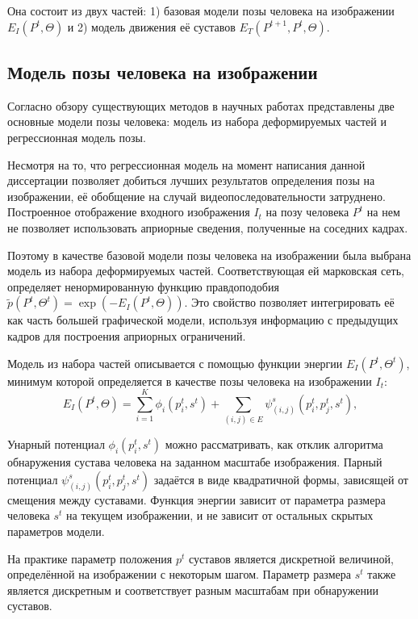 Она состоит из двух частей: 1) базовая модели позы человека на изображении $E_I(P^t, \Theta)$ и 2) модель движения её суставов $E_T(P^{t+1}, P^{t}, \Theta)$.

\subsection{Модель позы человека на изображении}

Согласно обзору существующих методов в научных работах представлены две основные модели позы человека: модель из набора деформируемых частей и регрессионная модель позы.

Несмотря на то, что регрессионная модель на момент написания данной диссертации позволяет добиться лучших результатов определения позы на изображении, её обобщение на случай видеопоследовательности затруднено. Построенное отображение входного изображения $I_t$ на позу человека $P^t$ на нем не позволяет использовать априорные сведения, полученные на соседних кадрах.

Поэтому в качестве базовой модели позы человека на изображении была выбрана модель из набора деформируемых частей. Соответствующая ей марковская сеть, определяет ненормированную функцию правдоподобия $\tilde{p}(P^t, \Theta^t) = \exp(-E_I(P^t, \Theta))$. Это свойство позволяет интегрировать её как часть большей графической модели, используя информацию с предыдущих кадров для построения априорных ограничений.

Модель из набора частей описывается с помощью функции энергии $E_I(P^t, \Theta^t)$, минимум которой определяется в качестве позы человека на изображении $I_t$:
\begin{equation}
	E_I(P^t, \Theta) = \sum_{i=1}^K{\phi_i(p_i^t, s^t)} + \sum_{\left(i,j\right)\in E}{\psi_{(i,j)}^s(p_i^t, p_j^t, s^t)},
	\label{eq::frame}
\end{equation}

Унарный потенциал $\phi_i(p_i^t, s^t)$ можно рассматривать, как отклик алгоритма обнаружения сустава человека на заданном масштабе изображения. Парный потенциал $\psi_{(i,j)}^s(p_i^t, p_j^t, s^t)$ задаётся в виде квадратичной формы, зависящей от смещения между суставами. Функция энергии зависит от параметра размера человека $s^t$ на текущем изображении, и не зависит от остальных скрытых параметров модели.

На практике параметр положения $p^t$ суставов является дискретной величиной, определённой на изображении с некоторым шагом. Параметр размера $s^t$ также является дискретным и соответствует разным масштабам при обнаружении суставов.

